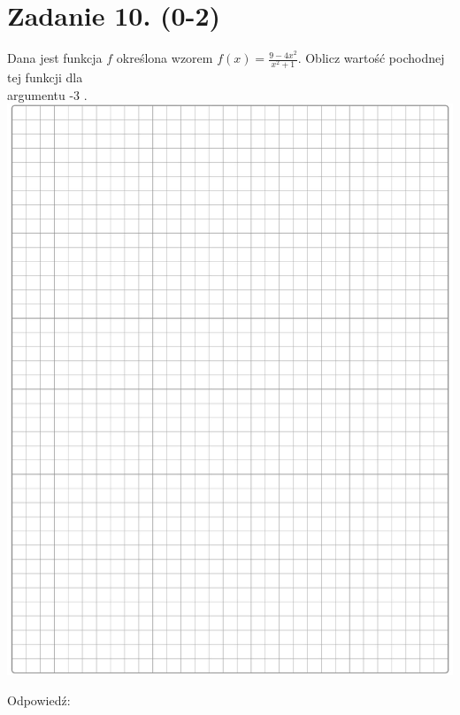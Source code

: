 \documentclass[10pt]{article}
\begin{document}
\section*{Zadanie 10. (0-2)}
Dana jest funkcja \(f\) określona wzorem \(f(x)=\frac{9-4 x^{2}}{x^{2}+1}\). Oblicz wartość pochodnej tej funkcji dla\\
argumentu -3 .\\
\includegraphics[max width=\textwidth, center]{2024_11_21_e30d1f37bf0e3631c088g-09}

Odpowiedź:
\end{document}
